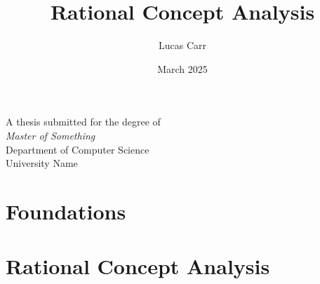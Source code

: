 \documentclass[12pt,a4paper]{report}
\title{Rational Concept Analysis}
\author{Lucas Carr}
\date{March 2025}
\begin{document}
\begin{titlepage}
    \centering
    \vspace*{4cm}
    {\Huge \bfseries \thetitle \par}
    \vspace{1.5cm}
    {\Large \theauthor \par}
    \vfill
    A thesis submitted for the degree of \\
    \textit{Master of Something} \\
    Department of Computer Science \\
    University Name \\
    \vspace{1cm}
    \thedate
\end{titlepage}



\tableofcontents
\part{Foundations}



\part{Rational Concept Analysis}


\printindex

\printbibliography
\end{document}
